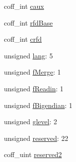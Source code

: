 \begin{DoxyCompactItemize}
\item 
coff\_\-int \hyperlink{structecoff__fdr_ab3dc7c8a9466e13fdade901bc156afe5}{caux}
\item 
coff\_\-int \hyperlink{structecoff__fdr_a24a42274fb666299d163bb9edf499557}{rfdBase}
\item 
coff\_\-int \hyperlink{structecoff__fdr_ae2db157889546ac1a32f93083c14889b}{crfd}
\item 
unsigned \hyperlink{structecoff__fdr_a9e1802112d624c7a02248861e4146df4}{lang}: 5
\item 
unsigned \hyperlink{structecoff__fdr_a46c6841a43bf111a633621eab5b09eb2}{fMerge}: 1
\item 
unsigned \hyperlink{structecoff__fdr_ae0aeb0fc333dbff6347fc8eae3021385}{fReadin}: 1
\item 
unsigned \hyperlink{structecoff__fdr_af0446c42b34217bfbbb029f43c269c2e}{fBigendian}: 1
\item 
unsigned \hyperlink{structecoff__fdr_a1c98d731b5081ab0e2f154b913ae31c2}{glevel}: 2
\item 
unsigned \hyperlink{structecoff__fdr_ab83f44f2d8cd59d5efbd929a633c2fc1}{reserved}: 22
\item 
coff\_\-uint \hyperlink{structecoff__fdr_ad8716975111f78844557ad0c2e1da75c}{reserved2}
\end{DoxyCompactItemize}


